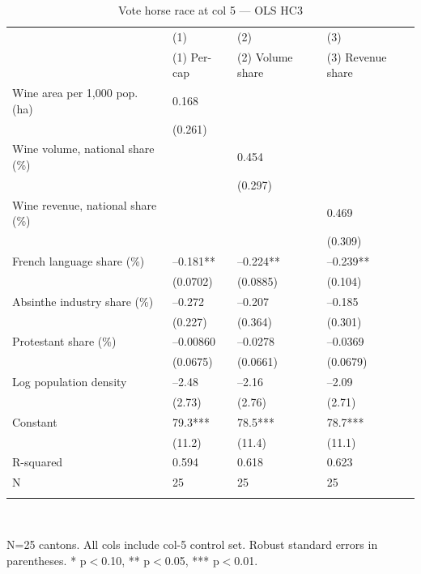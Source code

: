 \begin{table}[tbp] \centering
{}

\caption{Vote horse race at col 5 --- OLS HC3}
\label{tab:T3_OLS}
\begin{tabularx}{\linewidth}{@{}lCCC@{}}

\toprule
&{(1)}&{(2)}&{(3)} \tabularnewline
 & (1) Per-cap & (2) Volume share & (3) Revenue share \tabularnewline 
\midrule \addlinespace[\belowrulesep]
Wine area per 1,000 pop. (ha)&0.168&& \tabularnewline
&(0.261)&& \tabularnewline
Wine volume, national share (\%)&&0.454& \tabularnewline
&&(0.297)& \tabularnewline
Wine revenue, national share (\%)&&&0.469 \tabularnewline
&&&(0.309) \tabularnewline
French language share (\%)&--0.181**&--0.224**&--0.239** \tabularnewline
&(0.0702)&(0.0885)&(0.104) \tabularnewline
Absinthe industry share (\%)&--0.272&--0.207&--0.185 \tabularnewline
&(0.227)&(0.364)&(0.301) \tabularnewline
Protestant share (\%)&--0.00860&--0.0278&--0.0369 \tabularnewline
&(0.0675)&(0.0661)&(0.0679) \tabularnewline
Log population density&--2.48&--2.16&--2.09 \tabularnewline
&(2.73)&(2.76)&(2.71) \tabularnewline
Constant&79.3***&78.5***&78.7*** \tabularnewline
&(11.2)&(11.4)&(11.1) \tabularnewline
\midrule R-squared&0.594&0.618&0.623 \tabularnewline
N&25&25&25 \tabularnewline
\bottomrule \addlinespace[\belowrulesep]

\end{tabularx}
\\ \parbox{\linewidth}{\footnotesize N=25 cantons. All cols include col-5 control set. Robust standard errors in parentheses. * p\(<\)0.10, ** p\(<\)0.05, *** p\(<\)0.01.}
\end{table}
